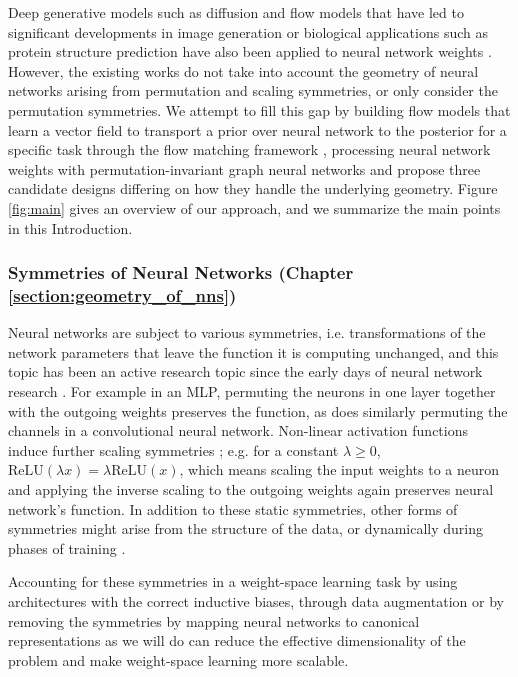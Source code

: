 Deep generative models such as diffusion and flow models that have led to significant developments in image generation \citep{esserScalingRectifiedFlow2024b} or biological applications such as protein structure prediction \citep{abramsonAccurateStructurePrediction2024} have also been applied to neural network weights \citep{peeblesLearningLearnGenerative2022,schurholtHyperRepresentationsLearningPopulations2024a}. However, the existing works do not take into account the geometry of neural networks arising from permutation and scaling symmetries, or only consider the permutation symmetries. We attempt to fill this gap by building flow models that learn a vector field to transport a prior over neural network to the posterior for a specific task through the flow matching framework \citep{lipmanFlowMatchingGuide2024}, processing neural network weights with permutation-invariant graph neural networks \citep{kofinasGraphNeuralNetworks2024,limGraphMetanetworksProcessing2023} and propose three candidate designs differing on how they handle the underlying geometry. Figure \ref{fig:main} gives an overview of our approach, and we summarize the main points in this Introduction. 

\subsubsection{Symmetries of Neural Networks (Chapter \ref{section:geometry_of_nns})}

Neural networks are subject to various symmetries, i.e. transformations of the network parameters that leave the function it is computing unchanged, and this topic has been an active research topic since the early days of neural network research \citep{hecht-nielsenALGEBRAICSTRUCTUREFEEDFORWARD1990}. For example in an MLP, permuting the neurons in one layer together with the outgoing weights preserves the function, as does similarly permuting the channels in a convolutional neural network. Non-linear activation functions induce further scaling symmetries \citep{godfreySymmetriesDeepLearning2022}; e.g. for a constant $\lambda \geq 0$, $\text{ReLU}(\lambda x) = \lambda \text{ReLU}(x)$, which means scaling the input weights to a neuron and applying the inverse scaling to the outgoing weights again preserves neural network's function. In addition to these static symmetries, other forms of symmetries might arise from the structure of the data, or dynamically during phases of training \citep{zhaoFindingSymmetryNeural2024}. 

Accounting for these symmetries in a weight-space learning task by using architectures with the correct inductive biases, through data augmentation \citep{shamsianImprovedGeneralizationWeight2024} or by removing the symmetries by mapping neural networks to canonical representations \citep{pittorinoDeepNetworksToroids2022} as we will do can reduce the effective dimensionality of the problem and make weight-space learning more scalable. 

